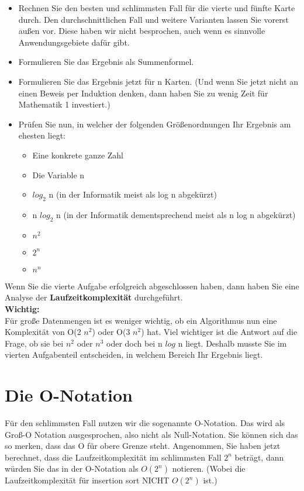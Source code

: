 \begin{itemize}
	\item Rechnen Sie den besten und schlimmsten Fall für die vierte und fünfte Karte durch. Den durchschnittlichen Fall und weitere Varianten lassen Sie vorerst außen vor. Diese haben wir nicht besprochen, auch wenn es sinnvolle Anwendungsgebiete dafür gibt.
	\item Formulieren Sie das Ergebnis als Summenformel.
	\item Formulieren Sie das Ergebnis jetzt für n Karten. (Und wenn Sie jetzt nicht an einen Beweis per Induktion denken, dann haben Sie zu wenig Zeit für Mathematik 1 investiert.)
	\item Prüfen Sie nun, in welcher der folgenden Größenordnungen Ihr Ergebnis am ehesten liegt:
	\begin{itemize}
		\item Eine konkrete ganze Zahl
		\item Die Variable n 
		\item \(log_2\) n (in der Informatik meist als log n abgekürzt)
		\item n \(log_2\) n (in der Informatik dementsprechend meist als n log n abgekürzt)
		\item \(n^2\)
		\item \(2^n\) 
		\item \(n^n\)
	\end{itemize}
\end{itemize}

Wenn Sie die vierte Aufgabe erfolgreich abgeschlossen haben, dann haben Sie eine Analyse der \textbf{Laufzeitkomplexität} durchgeführt.\\

\textbf{Wichtig:}\\

Für große Datenmengen ist es weniger wichtig, ob ein Algorithmus nun eine Komplexität von O(2 \(n^2\)) oder O(3 \(n^2\)) hat. Viel wichtiger ist die Antwort auf die Frage, ob sie bei \(n^2\) oder \(n^3\) oder doch bei n \(log\) n liegt. Deshalb musste Sie im vierten Aufgabenteil entscheiden, in welchem Bereich Ihr Ergebnis liegt.

\section{Die O-Notation}

Für den schlimmsten Fall nutzen wir die sogenannte O-Notation. Das wird als Groß-O Notation ausgesprochen, also nicht als Null-Notation. Sie können sich das so merken, dass das O für obere Grenze steht. Angenommen, Sie haben jetzt berechnet, dass die Laufzeitkomplexität im schlimmsten Fall \(2^n\) beträgt, dann würden Sie das in der O-Notation als \(O(2^n)\) notieren. (Wobei die Laufzeitkomplexität für insertion sort NICHT \(O(2^n)\) ist.)

